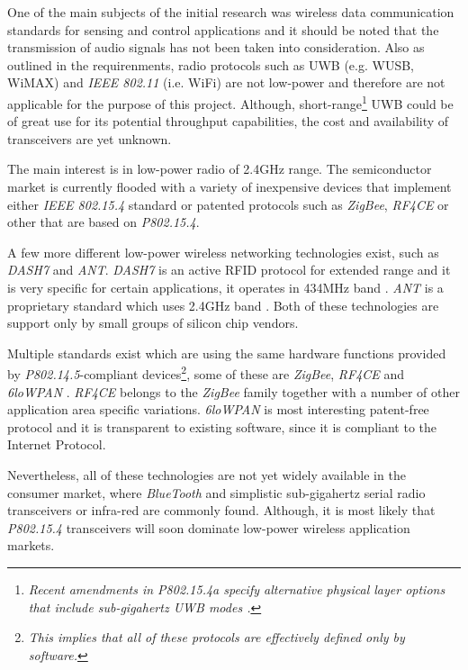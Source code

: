   One of the main subjects of the initial research was wireless data
 communication standards for sensing and control applications and it
 should be noted that the transmission of audio signals has not been
 taken into consideration. Also as outlined in the requirenments,
 radio protocols such as UWB (e.g. WUSB, WiMAX) and \emph{IEEE 802.11}
 (i.e. WiFi) are not low-power and therefore are not applicable for the
 purpose of this project. Although, short-range\footnote{\emph{Recent
 amendments in P802.15.4a specify alternative physical layer options
 that include sub-gigahertz UWB modes \cite{links:wiki:p:wpan}.}} UWB
 could be of great use for its potential throughput capabilities, the
 cost and availability of transceivers are yet unknown.
 
  The main interest is in low-power radio of 2.4GHz range. The semiconductor
 market is currently flooded with a variety of inexpensive devices that
 implement either \emph{IEEE 802.15.4} standard or patented protocols such
 as \emph{ZigBee}, \emph{RF4CE} or other that are based on \emph{P802.15.4}.

 A few more different low-power wireless networking technologies exist, such
 as \emph{DASH7} and \emph{ANT}. \emph{DASH7} is an active RFID protocol for
 extended range and it is very specific for certain applications, it operates
 in 434MHz band \cite{links:wiki:p:dash7}. \emph{ANT} is a proprietary standard
 which uses 2.4GHz band \cite{links:wiki:p:ant}. Both of these technologies
 are support only by small groups of silicon chip vendors.

 Multiple standards exist which are using the same hardware functions provided
 by \emph{P802.14.5}-compliant devices\footnote{\emph{This implies that all of
 these protocols are effectively defined only by software.}}, some of these are
 \emph{ZigBee}, \emph{RF4CE} and \emph{6loWPAN} \cite{links:wiki:p:6lowpan}.
 \emph{RF4CE} belongs to the \emph{ZigBee} \cite{links:wiki:p:zigbee} family
 together with a number of other application area specific variations.
 \emph{6loWPAN} \cite{links:wiki:p:6lowpan} is most interesting patent-free
 protocol and it is transparent to existing software, since it is compliant
 to the Internet Protocol. %

  Nevertheless, all of these technologies are not yet widely available in
 the consumer market, where \emph{BlueTooth} \cite{links:wiki:p:mrwpan} and
 simplistic sub-gigahertz serial radio transceivers or infra-red are commonly
 found. Although, it is most likely that \emph{P802.15.4} transceivers will
 soon dominate low-power wireless application markets.

